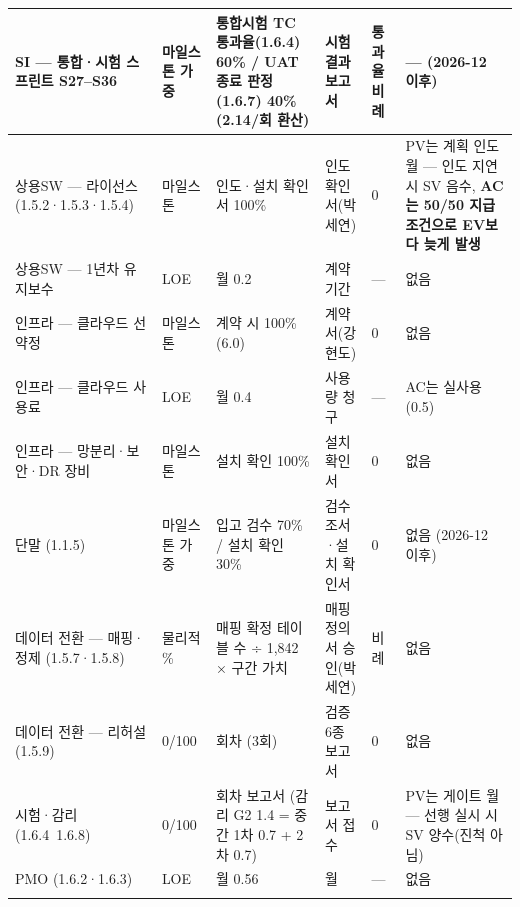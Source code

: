 \documentclass[10pt,a4paper]{article}
\begin{document}
{\begin{tabularx}{\linewidth}{|L{60mm}|L{22mm}|L{38mm}|L{42mm}|L{26mm}|Y|}
SI — 통합·시험 스프린트 S27–S36 & 마일스톤 가중 & 통합시험 TC 통과율(1.6.4) 60\% / UAT 종료 판정(1.6.7) 40\% (2.14/회 환산) & 시험 결과 보고서 & 통과율 비례 & — (2026-12 이후) \\ \hline
상용SW — 라이선스 (1.5.2·1.5.3·1.5.4) & 마일스톤 & 인도·설치 확인서 100\% & 인도 확인서(박세연) & 0 & PV는 계획 인도 월 — 인도 지연 시 SV 음수, \textbf{AC는 50/50 지급 조건으로 EV보다 늦게 발생} \\ \hline
상용SW — 1년차 유지보수 & LOE & 월 0.2 & 계약 기간 & — & 없음 \\ \hline
인프라 — 클라우드 선약정 & 마일스톤 & 계약 시 100\% (6.0) & 계약서(강현도) & 0 & 없음 \\ \hline
인프라 — 클라우드 사용료 & LOE & 월 0.4 & 사용량 청구 & — & AC는 실사용(0.5) \\ \hline
인프라 — 망분리·보안·DR 장비 & 마일스톤 & 설치 확인 100\% & 설치 확인서 & 0 & 없음 \\ \hline
단말 (1.1.5) & 마일스톤 가중 & 입고 검수 70\% / 설치 확인 30\% & 검수 조서·설치 확인서 & 0 & 없음 (2026-12 이후) \\ \hline
데이터 전환 — 매핑·정제 (1.5.7·1.5.8) & 물리적 \% & 매핑 확정 테이블 수 ÷ 1,842 × 구간 가치 & 매핑 정의서 승인(박세연) & 비례 & 없음 \\ \hline
데이터 전환 — 리허설 (1.5.9) & 0/100 & 회차 (3회) & 검증 6종 보고서 & 0 & 없음 \\ \hline
시험·감리 (1.6.4~1.6.8) & 0/100 & 회차 보고서 (감리 G2 1.4 = 중간 1차 0.7 + 2차 0.7) & 보고서 접수 & 0 & PV는 게이트 월 — 선행 실시 시 SV 양수(진척 아님) \\ \hline
PMO (1.6.2·1.6.3) & LOE & 월 0.56 & 월 & — & 없음 \\ \hline
\fi
\end{tabularx}}
\end{document}
